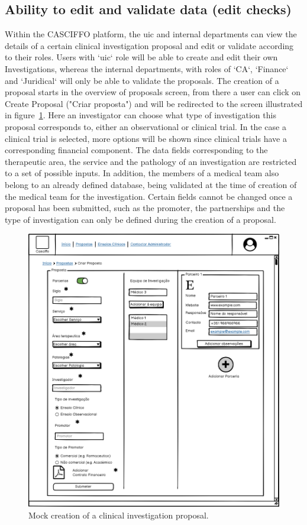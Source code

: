 \subsection{Ability to edit and validate data (edit checks)}
\label{subsec:abilitiy-to-edit}
Within the CASCIFFO platform, the \acrshort{uic} and internal departments can view the details of a certain clinical investigation proposal and edit or validate according to their roles.
Users with `\acrshort{uic}` role will be able to create and edit their own Investigations, whereas the internal departments, with roles of `CA`, `Finance` and `Juridical` will only be able to validate the proposals.  
The creation of a proposal starts in the overview of proposals screen, from there a user can click on Create Proposal ("Criar proposta") and will be redirected to the screen illustrated in figure~\ref{fig:criar-proposta}. Here an investigator can choose what type of investigation this proposal corresponds to, either an observational or clinical trial. In the case a clinical trial is selected, more options will be shown since clinical trials have a corresponding financial component.
The data fields corresponding to the therapeutic area, the service and the pathology of an investigation are restricted to a set of possible inputs. In addition, the members of a medical team also belong to an already defined database, being validated at the time of creation of the medical team for the investigation.  
Certain fields cannot be changed once a proposal has been submitted, such as the promoter, the partnerships and the type of investigation can only be defined during the creation of a proposal.  


\begin{figure}[H]
    \centering
    \includegraphics[scale=0.35]{Chapters/img/propostas/criar-proposta.png}
    \caption{Mock creation of a clinical investigation proposal.}
    \label{fig:criar-proposta}
\end{figure}

